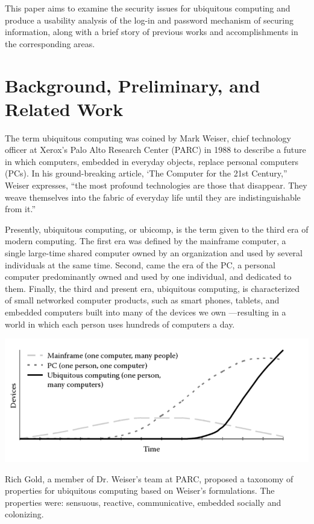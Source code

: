 \documentclass{article}
\begin{document}
This paper aims to examine the security issues for ubiquitous computing and produce a usability analysis of the log-in and password mechanism of securing information, along with a brief story of previous works and accomplishments in the corresponding areas. 

\section{Background, Preliminary, and Related Work}
The term ubiquitous computing was coined by Mark Weiser, chief technology officer at Xerox’s Palo Alto Research Center (PARC) in 1988 to describe a future in which computers, embedded in everyday objects, replace personal computers (PCs). In his ground-breaking article, ‘The Computer for the 21st Century,” Weiser expresses, “the most profound technologies are those that disappear. They weave themselves into the fabric of everyday life until they are indistinguishable from it.”\cite{}

Presently, ubiquitous computing, or ubicomp, is the term given to the third era of modern computing. The first era was defined by the mainframe computer, a single large-time shared computer owned by an organization and used by several individuals at the same time. Second, came the era of the PC, a personal computer predominantly owned and used by one individual, and dedicated to them. Finally, the third and present era, ubiquitous computing, is characterized of small networked computer products, such as smart phones, tablets, and embedded computers built into many of the devices we own ---resulting in a world in which each person uses hundreds of computers a day.

\includegraphics[scale=.6]{eras_modern_computing.png}

Rich Gold, a member of Dr. Weiser’s team at PARC, proposed a taxonomy of properties for ubiquitous computing based on Weiser’s formulations. The properties were: sensuous, reactive, communicative, embedded socially and colonizing. 
\end{document}
